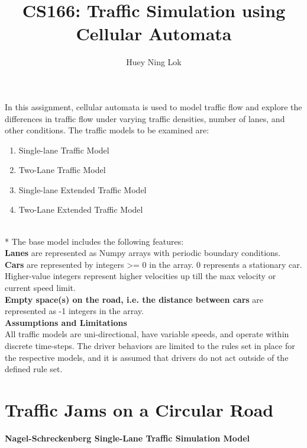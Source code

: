 \documentclass[11pt]{article}
\title{CS166: Traffic Simulation using Cellular Automata}
\author{Huey Ning Lok}
\def\br{\hspace*{\fill} \\* }
\begin{document}
    
    
    \maketitle
    


In this assignment, cellular automata is used to model traffic flow and
explore the differences in traffic flow under varying traffic densities,
number of lanes, and other conditions. The traffic models to be examined
are:

\begin{enumerate}
\def\labelenumi{\arabic{enumi})}
\item
  Single-lane Traffic Model
\item
  Two-Lane Traffic Model
\item
  Single-lane Extended Traffic Model
\item
  Two-Lane Extended Traffic Model
\end{enumerate}
\br
The base model includes the following features:\\


  \textbf{Lanes} are represented as Numpy arrays with periodic boundary conditions.\\
 
    \textbf{Cars} are represented by integers \textgreater{}= 0 in the array. 0 represents a stationary car. Higher-value integers represent higher velocities up till the max
    velocity or current speed limit.\\

    \textbf{Empty space(s) on the road, i.e. the distance between cars} are represented as -1 integers in the array.\\


\textbf{Assumptions and Limitations}
\\

All traffic models are uni-directional, have variable speeds, and
operate within discrete time-steps. The driver behaviors are limited to
the rules set in place for the respective models, and it is assumed that
drivers do not act outside of the defined rule set.

\newpage
\section{Traffic Jams on a Circular Road}

\textbf{Nagel-Schreckenberg Single-Lane Traffic Simulation Model}
\\
\end{document}
